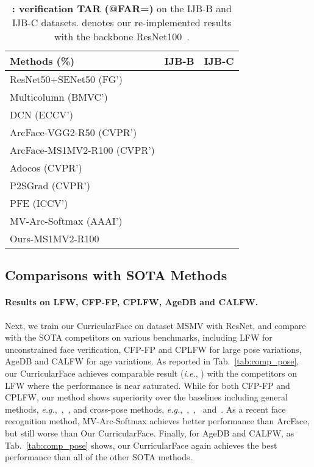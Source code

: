 \documentclass[10pt,twocolumn,letterpaper]{article}
\begin{document}
\begin{table}[t!]
\begin{center}
\scriptsize
\caption{\small \textbf{: verification TAR (@FAR=)} on the IJB-B and IJB-C datasets.  denotes our re-implemented results with the backbone ResNet100~\cite{deng2018arcface}.}
\label{tab:comp_ijb}
\begin{tabular}{l|cc}
\hline
Methods  (\%)          & IJB-B  & IJB-C  \\ \hline\hline
ResNet50+SENet50 (FG')    &  &   \\
Multicolumn (BMVC')       &  &   \\
DCN         (ECCV')       &  &   \\
ArcFace-VGG2-R50 (CVPR')  &  &   \\
ArcFace-MS1MV2-R100 (CVPR') &  &  \\
Adocos (CVPR')            &     &    \\
P2SGrad (CVPR')           &     &    \\
PFE (ICCV')               &     &    \\
MV-Arc-Softmax (AAAI') &  &   \\\hline
Ours-MS1MV2-R100  &  &  \\\hline
\end{tabular}
\vspace{-3mm}
\end{center}
\end{table}

\subsection{Comparisons with SOTA Methods}
\paragraph{Results on LFW, CFP-FP, CPLFW, AgeDB and CALFW.}
Next, we train our CurricularFace on dataset MSMV with ResNet, and compare with the SOTA competitors on various benchmarks, including LFW for unconstrained face verification, CFP-FP and CPLFW for large pose variations, AgeDB and CALFW for age variations.
As reported in Tab.~\ref{tab:comp_pose}, our CurricularFace achieves comparable result (\textit{i.e.}, ) with the competitors on LFW where the performance is near saturated.
While for both CFP-FP and CPLFW, our method shows superiority over the baselines including general methods, \textit{e.g.},~\cite{wen2016discriminative},~\cite{cao2018vggface2}, and cross-pose methods, \textit{e.g.},~\cite{tran2017disentangled},~\cite{peng2017rec},~\cite{cao2018pose} and~\cite{deng2018uvgan}.
As a recent face recognition method, MV-Arc-Softmax achieves better performance than ArcFace, but still worse than Our CurricularFace.
Finally, for AgeDB and CALFW, as Tab.~\ref{tab:comp_pose} shows, our CurricularFace again achieves the best performance than all of the other SOTA methods.
\end{document}
